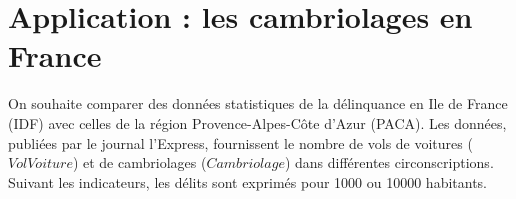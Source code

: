 \documentclass[11pt,a4paper]{article}
\begin{document}
				
				
				
				\section*{\Large Application : les cambriolages en France}
				On souhaite comparer des donn\'ees statistiques de la d\'elinquance en Ile de France (IDF) avec celles de la r\'egion Provence-Alpes-C\^ote d'Azur (PACA). 
				Les donn\'ees, publi\'ees par le journal l'Express, fournissent le nombre de vols de voitures ($VolVoiture$) et de cambriolages ($Cambriolage$) dans diff\'erentes circonscriptions. Suivant les indicateurs, les d\'elits sont exprim\'es pour 1000 ou 10000 habitants.\\
\end{document}
